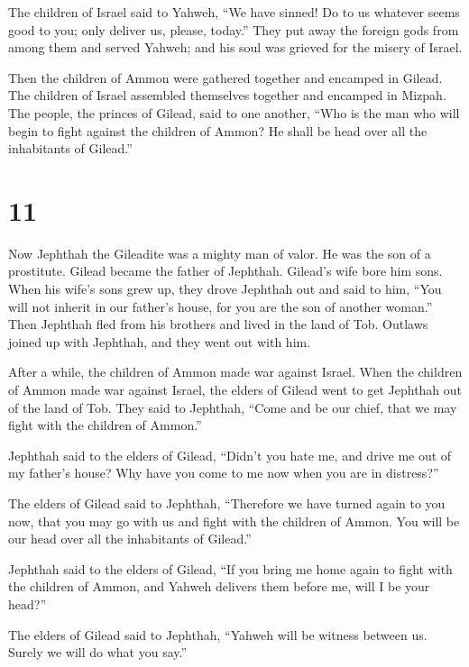  The children of Israel said to Yahweh, ``We have sinned!
Do to us whatever seems good to you; only deliver us, please, today.''
 They put away the foreign gods from among them and
served Yahweh; and his soul was grieved for the misery of Israel.

 Then the children of Ammon were gathered together and
encamped in Gilead. The children of Israel assembled themselves together
and encamped in Mizpah.  The people, the princes of
Gilead, said to one another, ``Who is the man who will begin to fight
against the children of Ammon? He shall be head over all the inhabitants
of Gilead.''

\hypertarget{section-10}{%
\section{11}\label{section-10}}

 Now Jephthah the Gileadite was a mighty man of valor. He
was the son of a prostitute. Gilead became the father of Jephthah.
 Gilead's wife bore him sons. When his wife's sons grew
up, they drove Jephthah out and said to him, ``You will not inherit in
our father's house, for you are the son of another woman.''
 Then Jephthah fled from his brothers and lived in the
land of Tob. Outlaws joined up with Jephthah, and they went out with
him.

 After a while, the children of Ammon made war against
Israel.  When the children of Ammon made war against
Israel, the elders of Gilead went to get Jephthah out of the land of
Tob.  They said to Jephthah, ``Come and be our chief, that
we may fight with the children of Ammon.''

 Jephthah said to the elders of Gilead, ``Didn't you hate
me, and drive me out of my father's house? Why have you come to me now
when you are in distress?''

 The elders of Gilead said to Jephthah, ``Therefore we
have turned again to you now, that you may go with us and fight with the
children of Ammon. You will be our head over all the inhabitants of
Gilead.''

 Jephthah said to the elders of Gilead, ``If you bring me
home again to fight with the children of Ammon, and Yahweh delivers them
before me, will I be your head?''

 The elders of Gilead said to Jephthah, ``Yahweh will be
witness between us. Surely we will do what you say.''

